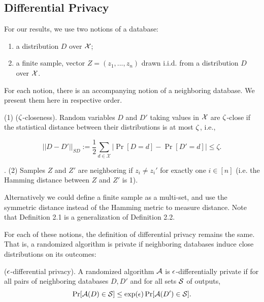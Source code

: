 

\subsection{Differential Privacy}

For our results, we use two notions of a database:

\begin{enumerate}
	\item a distribution $D$ over $\X$;
	\item a finite sample, vector $Z = (z_1, ..., z_n)$ drawn i.i.d. from a distribution $D$ over $\X$.
\end{enumerate}
For each notion, there is an accompanying notion of a neighboring database. We present them here in respective order.

\begin{defn}
  (1) ($\zt$-closeness). Random variables $D$ and $D'$ taking values in
  $\X$ are $\zt$-close if the statistical distance between their
  distributions is at most $\zt$, i.e.,

	$$ ||D-D'||_{\textit{SD}} :=\frac{1}{2}\sum_{d\in \mathcal{X}}
  |\Pr[D=d] - \Pr[D'=d]| \leq \zeta.$$
\end{defn}

\begin{defn} .
  (2) Samples $Z$ and $Z'$ are neighboring if $z_i \neq z_i'$ for
  exactly one $i \in [n]$ (i.e. the Hamming distance between $Z$ and
  $Z'$ is 1).
\end{defn}
Alternatively we could define a finite sample as a multi-set, and use
the symmetric distance instead of the Hamming metric to measure
distance. Note that Definition 2.1 is a generalization of Definition
2.2.

For each of these notions, the definition of differential privacy
remains the same. That is, a randomized algorithm is private if
neighboring databases induce close distributions on its outcomes:

\begin{defn}
  ($\eps$-differential privacy).  A randomized algorithm
    $\A$ is $\eps$-differentially private if for all pairs of
    neighboring databases $D,D'$ and for all sets $\S$ of outputs,
    $$\Pr[\A(D)\in \S] \leq \exp(\eps)\Pr[\A(D')\in \S].$$
\end{defn}


